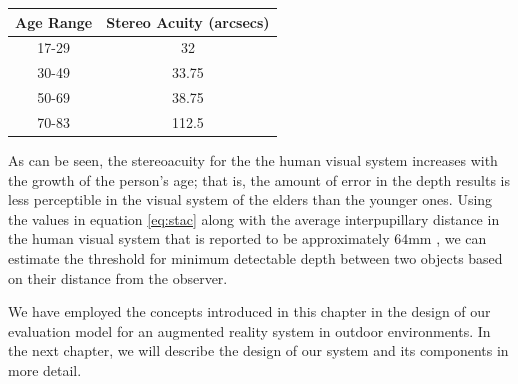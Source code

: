 \begin{minipage}{\linewidth}
\begin{center}
\label{tab:stAcAge}
\begin{tabular}{ |c|c| }
\hline
\textbf{Age Range} & \textbf{Stereo Acuity (arcsecs)} \\ \hline
17-29 & 32 \\  \hline
30-49 & 33.75 \\ \hline
50-69 & 38.75 \\ \hline
70-83 & 112.5 \\ \hline
\end{tabular}
\end{center}
\end{minipage} \newline \newline

As can be seen, the stereoacuity for the the human visual system increases with the growth of the person's age; that is, 
the amount of error in the depth results 
is less perceptible in the visual system of the elders than the younger ones.
Using the values in equation \ref{eq:stac} along with the average interpupillary distance in the human visual system 
that is reported to be approximately $64$mm \cite{how95}, 
we can estimate the threshold for minimum detectable depth
between two objects based on their distance from the observer. \newline 

We have employed the concepts introduced in this chapter in the design of our evaluation model for an augmented reality system 
in outdoor environments.
In the next chapter, we will describe the design of our system and its components in more detail.
